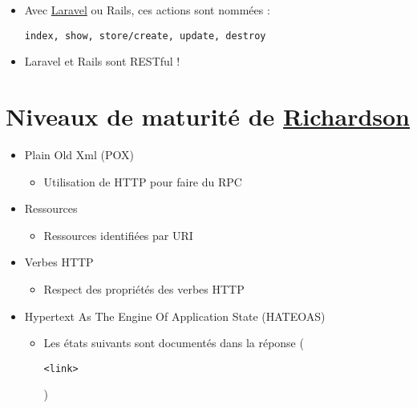 \begin{itemize}
\tightlist
\item
  Avec
  \href{https://laravel.com/docs/master/controllers\#resource-controllers}{Laravel}
  ou Rails, ces actions sont nommées :
  \begin{otherlanguage}{english}\texttt{index,\ show,\ store/create,\ update,\ destroy}\end{otherlanguage}
\item
  Laravel et Rails sont RESTful !
\end{itemize}

\hypertarget{niveaux-de-maturituxe9-de-richardson18}{%
\section{\texorpdfstring{Niveaux de maturité de
\href{http://martinfowler.com/articles/richardsonMaturityModel.html}{Richardson}}{Niveaux de maturité de Richardson}}\label{niveaux-de-maturituxe9-de-richardson18}}

\begin{itemize}
\tightlist
\item
  Plain Old Xml (POX)

  \begin{itemize}
  \tightlist
  \item
    Utilisation de HTTP pour faire du RPC
  \end{itemize}
\item
  Ressources

  \begin{itemize}
  \tightlist
  \item
    Ressources identifiées par URI
  \end{itemize}
\item
  Verbes HTTP

  \begin{itemize}
  \tightlist
  \item
    Respect des propriétés des verbes HTTP
  \end{itemize}
\item
  Hypertext As The Engine Of Application State (HATEOAS)

  \begin{itemize}
  \tightlist
  \item
    Les états suivants sont documentés dans la réponse
    (\begin{otherlanguage}{english}\texttt{\textless{}link\textgreater{}}\end{otherlanguage})
  \end{itemize}
\end{itemize}

